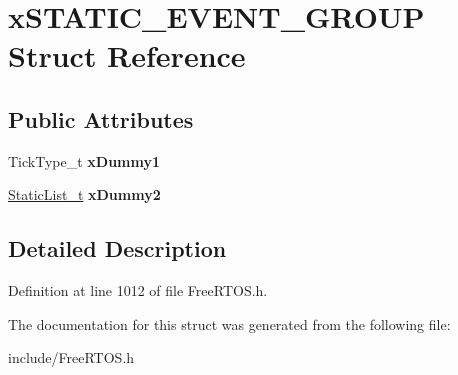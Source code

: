 \hypertarget{structxSTATIC__EVENT__GROUP}{}\section{x\+S\+T\+A\+T\+I\+C\+\_\+\+E\+V\+E\+N\+T\+\_\+\+G\+R\+O\+UP Struct Reference}
\label{structxSTATIC__EVENT__GROUP}
\subsection*{Public Attributes}
\begin{DoxyCompactItemize}
\item 
\mbox{\label{structxSTATIC__EVENT__GROUP_a4ed0094f715dd8f79a354f42fd973fc6}} 
Tick\+Type\+\_\+t {\bfseries x\+Dummy1}
\item 
\mbox{\label{structxSTATIC__EVENT__GROUP_a17d070c972ecd0151d7505a539653551}} 
\mbox{\hyperlink{structxSTATIC__LIST}{Static\+List\+\_\+t}} {\bfseries x\+Dummy2}
\end{DoxyCompactItemize}


\subsection{Detailed Description}


Definition at line 1012 of file Free\+R\+T\+O\+S.\+h.



The documentation for this struct was generated from the following file\+:\begin{DoxyCompactItemize}
\item 
include/Free\+R\+T\+O\+S.\+h\end{DoxyCompactItemize}
